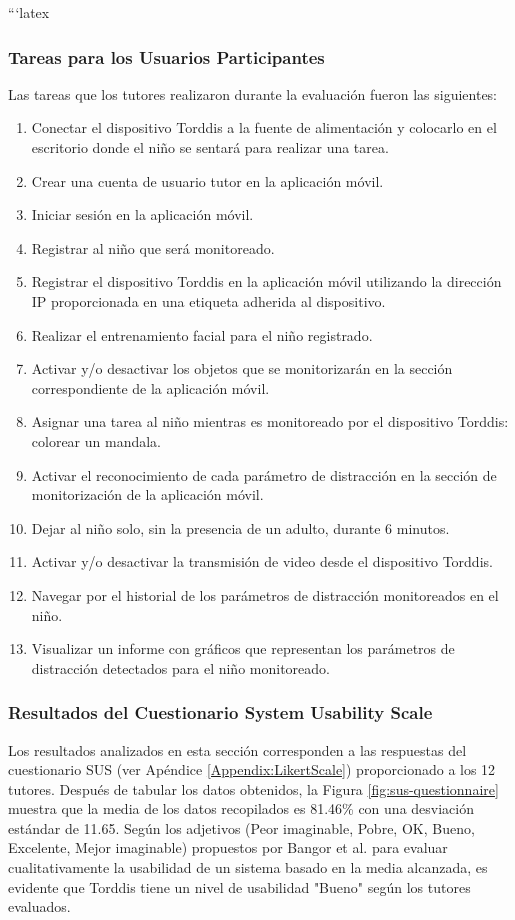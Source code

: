 \documentclass[a4paper,fleqn]{cas-sc}
\begin{document}
	```latex
	\subsubsection{Tareas para los Usuarios Participantes}
	Las tareas que los tutores realizaron durante la evaluación fueron las siguientes:
	
	\begin{enumerate}
		\item Conectar el dispositivo Torddis a la fuente de alimentación y colocarlo en el escritorio donde el niño se sentará para realizar una tarea.
		\item Crear una cuenta de usuario tutor en la aplicación móvil.
		\item Iniciar sesión en la aplicación móvil.
		\item Registrar al niño que será monitoreado.
		\item Registrar el dispositivo Torddis en la aplicación móvil utilizando la dirección IP proporcionada en una etiqueta adherida al dispositivo.
		\item Realizar el entrenamiento facial para el niño registrado.
		\item Activar y/o desactivar los objetos que se monitorizarán en la sección correspondiente de la aplicación móvil.
		\item Asignar una tarea al niño mientras es monitoreado por el dispositivo Torddis: colorear un mandala.
		\item Activar el reconocimiento de cada parámetro de distracción en la sección de monitorización de la aplicación móvil.
		\item Dejar al niño solo, sin la presencia de un adulto, durante 6 minutos.
		\item Activar y/o desactivar la transmisión de video desde el dispositivo Torddis.
		\item Navegar por el historial de los parámetros de distracción monitoreados en el niño.
		\item Visualizar un informe con gráficos que representan los parámetros de distracción detectados para el niño monitoreado.
	\end{enumerate}
	
	\subsubsection{Resultados del Cuestionario System Usability Scale}
	Los resultados analizados en esta sección corresponden a las respuestas del cuestionario SUS (ver Apéndice \ref{Appendix:LikertScale}) proporcionado a los 12 tutores. Después de tabular los datos obtenidos, la Figura \ref{fig:sus-questionnaire} muestra que la media de los datos recopilados es 81.46\% con una desviación estándar de 11.65. Según los adjetivos (Peor imaginable, Pobre, OK, Bueno, Excelente, Mejor imaginable) propuestos por Bangor et al. \cite{Bangor2008AnEmpirical} para evaluar cualitativamente la usabilidad de un sistema basado en la media alcanzada, es evidente que Torddis tiene un nivel de usabilidad "Bueno" según los tutores evaluados.
	
\end{document}
